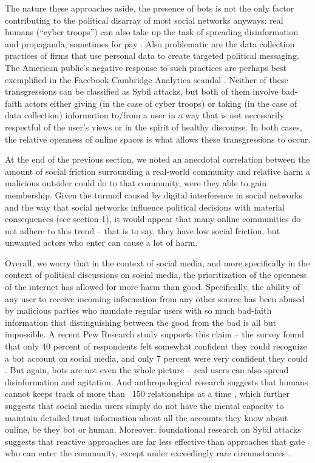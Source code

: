 \documentclass[sigconf,authordraft]{acmart}
\begin{document}
 
The nature these approaches aside, the presence of bots is not the  only factor contributing to the political disarray of most social networks anyways: real humans (``cyber troops'') can also take up the task of spreading disinformation and propaganda, sometimes for pay \cite{bradshaw2017troops}. Also problematic are the data collection practices of firms that use personal data to create targeted political messaging. The American public's negative response to such practices are perhaps best exemplified in the Facebook-Cambridge Analytica scandal \cite{CambridgeAnalyticaNYT}. Neither of these transgressions can be classified as Sybil attacks, but both of them involve bad-faith actors either giving (in the case of cyber troops) or taking (in the case of data collection) information to/from a user in a way that is not necessarily respectful of the user's views or in the spirit of healthy discourse. In both cases, the relative openness of online spaces is what allows these transgressions to occur.

At the end of the previous section, we noted an anecdotal correlation between the amount of social friction surrounding a real-world community and relative harm a malicious outsider could do to that community, were they able to gain membership. Given the turmoil caused by digital interference in social networks and the way that social networks influence political decisions with material consequences (see section 1), it would appear that many online communities do not adhere to this trend -- that is to say, they have low social friction, but unwanted actors who enter can cause a lot of harm. 

Overall, we worry that in the context of social media, and more specifically in the context of political discussions on social media, the prioritization of the openness of the internet has allowed for more harm than good. Specifically, the ability of any user to receive incoming information from any other source has been abused by malicious parties who inundate regular users with so much bad-faith information that distinguishing between the good from the bad is all but impossible. A recent Pew Research study supports this claim -- the survey found that only 40 percent of respondents felt somewhat confident they could recognize a bot account on social media, and only 7 percent were very confident they could \cite{PewBotStudy}. But again, bots are not even the whole picture -- real users can also spread disinformation and agitation. And anthropological research suggests that humans cannot keeps track of more than ~150 relationships at a time \cite{zhou2005discrete}, which further suggests that social media users simply do not have the mental capacity to maintain detailed trust information about all the accounts they know about online, be they bot or human. Moreover, foundational research on Sybil attacks suggests that reactive approaches are far less effective than approaches that gate who can enter the community, except under exceedingly rare circumstances \cite{douceur2002sybil}.
\end{document}
